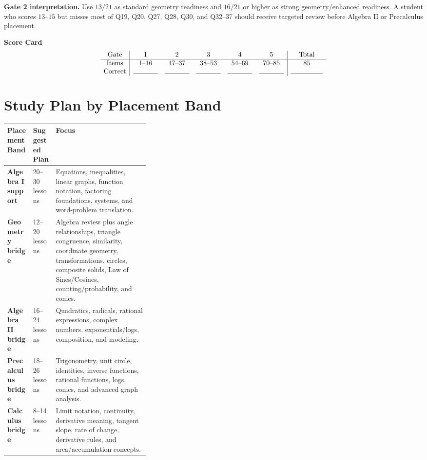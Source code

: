 \documentclass[11pt]{article}
\begin{document}
\begin{guidebox}
\textbf{Gate 2 interpretation.} Use \(13/21\) as standard geometry readiness and \(16/21\) or higher as strong geometry/enhanced readiness. A student who scores \(13\)--\(15\) but misses most of Q19, Q20, Q27, Q28, Q30, and Q32--37 should receive targeted review before Algebra II or Precalculus placement.
\end{guidebox}

\begin{guidebox}
\textbf{Score Card}
\[
\begin{array}{c|ccccc|c}
\text{Gate} & 1 & 2 & 3 & 4 & 5 & \text{Total}\\ \hline
\text{Items} & 1\text{--}16 & 17\text{--}37 & 38\text{--}53 & 54\text{--}69 & 70\text{--}85 & 85\\
\text{Correct} & \rule{0.5in}{0.4pt} & \rule{0.5in}{0.4pt} & \rule{0.5in}{0.4pt} & \rule{0.5in}{0.4pt} & \rule{0.5in}{0.4pt} & \rule{0.65in}{0.4pt}
\end{array}
\]
\end{guidebox}

\newpage
\section*{Study Plan by Placement Band}

\begin{center}
\begin{tabularx}{\linewidth}{>{\bfseries}p{0.18\linewidth}p{0.16\linewidth}X}
\toprule
Placement Band & Suggested Plan & Focus\\
\midrule
Algebra I support & 20--30 lessons & Equations, inequalities, linear graphs, function notation, factoring foundations, systems, and word-problem translation.\\
Geometry bridge & 12--20 lessons & Algebra review plus angle relationships, triangle congruence, similarity, coordinate geometry, transformations, circles, composite solids, Law of Sines/Cosines, counting/probability, and conics.\\
Algebra II bridge & 16--24 lessons & Quadratics, radicals, rational expressions, complex numbers, exponentials/logs, composition, and modeling.\\
Precalculus bridge & 18--26 lessons & Trigonometry, unit circle, identities, inverse functions, rational functions, logs, conics, and advanced graph analysis.\\
Calculus bridge & 8--14 lessons & Limit notation, continuity, derivative meaning, tangent slope, rate of change, derivative rules, and area/accumulation concepts.\\
\bottomrule
\end{tabularx}
\end{center}
\end{document}
